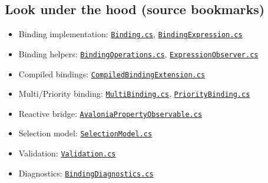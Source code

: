 \subsection{Look under the hood (source
bookmarks)}\label{look-under-the-hood-source-bookmarks-6}

\begin{itemize}
\tightlist
\item
  Binding implementation:
  \href{https://github.com/AvaloniaUI/Avalonia/blob/master/src/Avalonia.Base/Data/Binding.cs}{\passthrough{\lstinline!Binding.cs!}},
  \href{https://github.com/AvaloniaUI/Avalonia/blob/master/src/Avalonia.Base/Data/BindingExpression.cs}{\passthrough{\lstinline!BindingExpression.cs!}}
\item
  Binding helpers:
  \href{https://github.com/AvaloniaUI/Avalonia/blob/master/src/Avalonia.Base/Data/BindingOperations.cs}{\passthrough{\lstinline!BindingOperations.cs!}},
  \href{https://github.com/AvaloniaUI/Avalonia/blob/master/src/Avalonia.Base/Data/ExpressionObserver.cs}{\passthrough{\lstinline!ExpressionObserver.cs!}}
\item
  Compiled bindings:
  \href{https://github.com/AvaloniaUI/Avalonia/blob/master/src/Markup/Avalonia.Markup.Xaml/MarkupExtensions/CompiledBindingExtension.cs}{\passthrough{\lstinline!CompiledBindingExtension.cs!}}
\item
  Multi/Priority binding:
  \href{https://github.com/AvaloniaUI/Avalonia/blob/master/src/Markup/Avalonia.Markup/Data/MultiBinding.cs}{\passthrough{\lstinline!MultiBinding.cs!}},
  \href{https://github.com/AvaloniaUI/Avalonia/blob/master/src/Markup/Avalonia.Markup/Data/PriorityBinding.cs}{\passthrough{\lstinline!PriorityBinding.cs!}}
\item
  Reactive bridge:
  \href{https://github.com/AvaloniaUI/Avalonia/blob/master/src/Avalonia.Base/Reactive/AvaloniaPropertyObservable.cs}{\passthrough{\lstinline!AvaloniaPropertyObservable.cs!}}
\item
  Selection model:
  \href{https://github.com/AvaloniaUI/Avalonia/blob/master/src/Avalonia.Controls/Selection/SelectionModel.cs}{\passthrough{\lstinline!SelectionModel.cs!}}
\item
  Validation:
  \href{https://github.com/AvaloniaUI/Avalonia/blob/master/src/Avalonia.Controls/Validation/Validation.cs}{\passthrough{\lstinline!Validation.cs!}}
\item
  Diagnostics:
  \href{https://github.com/AvaloniaUI/Avalonia/blob/master/src/Avalonia.Diagnostics/Diagnostics/BindingDiagnostics.cs}{\passthrough{\lstinline!BindingDiagnostics.cs!}}
\end{itemize}


